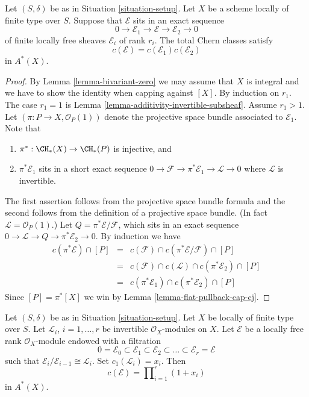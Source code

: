 \begin{lemma}
\label{lemma-additivity-chern-classes}
Let $(S, \delta)$ be as in Situation \ref{situation-setup}.
Let $X$ be a scheme locally of finite type over $S$.
Suppose that ${\mathcal E}$ sits in an
exact sequence
$$
0
\to
{\mathcal E}_1
\to
{\mathcal E}
\to
{\mathcal E}_2
\to
0
$$
of finite locally free sheaves $\mathcal{E}_i$ of rank $r_i$.
The total Chern classes satisfy
$$
c({\mathcal E}) = c({\mathcal E}_1) c({\mathcal E}_2)
$$
in $A^*(X)$.
\end{lemma}

\begin{proof}
By Lemma \ref{lemma-bivariant-zero} we may assume that $X$ is integral
and we have to show the identity when capping against $[X]$.
By induction on $r_1$. The case $r_1 = 1$ is
Lemma \ref{lemma-additivity-invertible-subsheaf}.
Assume $r_1 > 1$. Let $(\pi : P \to X, \mathcal{O}_P(1))$
denote the projective space bundle associated to $\mathcal{E}_1$. Note that
\begin{enumerate}
\item $\pi^* : \CH_*(X) \to \CH_*(P)$ is injective, and
\item $\pi^*\mathcal{E}_1$ sits in a short exact sequence
$0 \to \mathcal{F} \to \pi^*\mathcal{E}_1 \to \mathcal{L} \to 0$
where $\mathcal{L}$ is invertible.
\end{enumerate}
The first assertion follows from the projective space bundle formula
and the second follows from the definition of a projective space bundle.
(In fact $\mathcal{L} = \mathcal{O}_P(1)$.)
Let $Q = \pi^*\mathcal{E}/\mathcal{F}$, which sits in an
exact sequence $0 \to \mathcal{L} \to Q \to \pi^*\mathcal{E}_2 \to 0$.
By induction we have
\begin{eqnarray*}
c(\pi^*\mathcal{E}) \cap [P]
& = &
c(\mathcal{F}) \cap c(\pi^*\mathcal{E}/\mathcal{F}) \cap [P] \\
& = &
c(\mathcal{F}) \cap c(\mathcal{L}) \cap c(\pi^*\mathcal{E}_2) \cap [P] \\
& = &
c(\pi^*\mathcal{E}_1) \cap c(\pi^*\mathcal{E}_2) \cap [P]
\end{eqnarray*}
Since $[P] = \pi^*[X]$ we
win by Lemma \ref{lemma-flat-pullback-cap-cj}.
\end{proof}

\begin{lemma}
\label{lemma-chern-filter-by-linebundles}
Let $(S, \delta)$ be as in Situation \ref{situation-setup}.
Let $X$ be locally of finite type over $S$.
Let ${\mathcal L}_i$, $i = 1, \ldots, r$ be invertible
$\mathcal{O}_X$-modules on $X$.
Let $\mathcal{E}$ be a locally free rank
$\mathcal{O}_X$-module endowed with a filtration
$$
0 = \mathcal{E}_0 \subset \mathcal{E}_1 \subset \mathcal{E}_2
\subset \ldots \subset \mathcal{E}_r = \mathcal{E}
$$
such that $\mathcal{E}_i/\mathcal{E}_{i - 1} \cong \mathcal{L}_i$.
Set $c_1({\mathcal L}_i) = x_i$. Then
$$
c(\mathcal{E})
=
\prod\nolimits_{i = 1}^r (1 + x_i)
$$
in $A^*(X)$.
\end{lemma}

